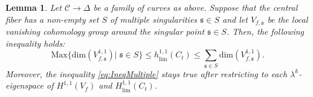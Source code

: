 \documentclass[12pt, letterpaper]{amsart}
\theoremstyle{plain}
\newtheorem{lemma}[theorem]{Lemma}
\theoremstyle{definition}
\newcommand{\s}{\mathfrak{s}}
\begin{document}
\begin{lemma}\label{lemma:OnlyOneSing}
Let $\mathcal{C} \to \Delta$ be a family of curves as above. Suppose that the central fiber has a non-empty set $S$ of multiple singularities 
$ \s \in S$ and let $V_{f,\s}$ be the local vanishing cohomology group around the singular point 
$ \s \in S$. Then, the following inequality holds:
\begin{equation}\label{eq:IneqMultiple}
    \mathrm{Max}\{\mathrm{dim}(V_{f,\s}^{1,1})| \; \s\in S\}
    \leq h^{1,1}_{\mathrm{lim}}(C_t)\leq \sum_{\s \in S}\mathrm{dim}(V_{f,\s}^{1,1}).
\end{equation}
Moreover, the inequality \eqref{eq:IneqMultiple} stays true after restricting to each $\lambda^k$-eigenspace of $H^{1,1}(V_f)$ and $H^{1,1}_{\mathrm{lim}}(C_t)$. 
\end{lemma}
\end{document}
